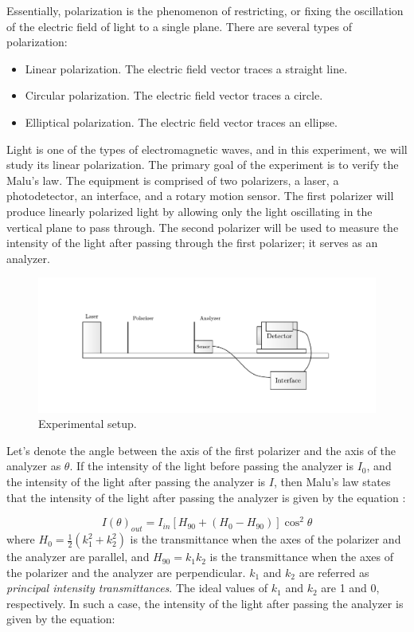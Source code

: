 \documentclass[10pt]{article}
\begin{document}
Essentially, polarization is the phenomenon of restricting, or fixing the oscillation of the electric field of light to a single plane. There are several types of polarization:
\begin{itemize}
  \item Linear polarization. The electric field vector traces a straight line.
  \item Circular polarization. The electric field vector traces a circle.
  \item Elliptical polarization. The electric field vector traces an ellipse.
\end{itemize}

Light is one of the types of electromagnetic waves, and in this experiment, we will study its linear polarization. The primary goal of the experiment is to verify the Malu's law. The equipment is comprised of two polarizers, a laser, a photodetector, an interface, and a rotary motion sensor. The first polarizer will produce linearly polarized light by allowing only the light oscillating in the vertical plane to pass through. The second polarizer will be used to measure the intensity of the light after passing through the first polarizer; it serves as an analyzer.

\begin{figure}[ht]
  \centering
  \includegraphics[scale=0.6]{figures/f1.pdf}
  \caption{Experimental setup.}
  \label{fig:1}
\end{figure}

Let's denote the angle between the axis of the first polarizer and the axis of the analyzer as $\theta$. If the intensity of the light before passing the analyzer is $I_0$, and the intensity of the light after passing the analyzer is $I$, then Malu's law states that the intensity of the light after passing the analyzer is given by the equation \cite{Damian_2006}:

\begin{equation}
  I(\theta)_{out} = I_{in}\left[H_{90}+\left(H_0-H_{90}\right)\right]\cos^2\theta
  \label{eq:1}
\end{equation}
where $H_0=\frac{1}{2}(k_1^2 + k_2^2)$ is the transmittance when the axes of the polarizer and the analyzer are parallel, and $H_{90}=k_1k_2$ is the transmittance when the axes of the polarizer and the analyzer are perpendicular. $k_1$ and $k_2$ are referred as \textit{principal intensity transmittances}. The ideal values of $k_1$ and $k_2$ are 1 and 0, respectively. In such a case, the intensity of the light after passing the analyzer is given by the equation:
\end{document}
